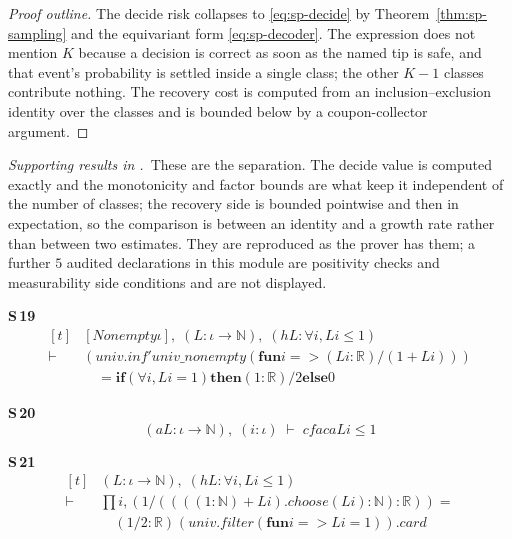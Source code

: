 \begin{proof}[Proof outline]
The decide risk collapses to \eqref{eq:sp-decide} by Theorem~\ref{thm:sp-sampling} and the
equivariant form \eqref{eq:sp-decoder}. The expression does not mention $K$ because a decision is
correct as soon as the named tip is safe, and that event's probability is settled inside a
single class; the other $K-1$ classes contribute nothing. The recovery cost is computed from
an inclusion--exclusion identity over the classes and is bounded below by a coupon-collector
argument.
\end{proof}


\noindent\emph{Supporting results in .}~These are the separation. The decide value is computed exactly and the monotonicity and factor bounds are what keep it independent of the number of classes; the recovery side is bounded pointwise and then in expectation, so the comparison is between an identity and a growth rate rather than between two estimates. They are reproduced as the prover has them; a further $5$ audited declarations in this module are positivity checks and measurability side conditions and are not displayed.

\noindent\textbf{S\,19}\quad{}
{\footnotesize\[ \begin{aligned}[t]
&[\mathit{Nonempty} \iota ],\; (\mathit{L} : \iota \to \mathbb{N} ),\; (\mathit{hL} : \forall \mathit{i}, \mathit{L} \mathit{i} \leq 1)\\
\vdash\;&(\mathit{univ}.\mathit{inf'} \mathit{univ\_nonempty} (\mathbf{fun} \mathit{i} => (\mathit{L} \mathit{i} : \mathbb{R} ) / (1 + \mathit{L} \mathit{i})))\\
&\quad = \mathbf{if} (\forall \mathit{i}, \mathit{L} \mathit{i} = 1) \mathbf{then} (1 : \mathbb{R} ) / 2 \mathbf{else} 0
\end{aligned} \]}

\noindent\textbf{S\,20}\quad{}
{\footnotesize\[ (\mathit{a} \mathit{L} : \iota \to \mathbb{N} ),\; (\mathit{i} : \iota ) \;\vdash\; \mathit{cfac} \mathit{a} \mathit{L} \mathit{i} \leq 1 \]}

\noindent\textbf{S\,21}\quad{}
{\footnotesize\[ \begin{aligned}[t]
&(\mathit{L} : \iota \to \mathbb{N} ),\; (\mathit{hL} : \forall \mathit{i}, \mathit{L} \mathit{i} \leq 1)\\
\vdash\;&\textstyle\prod \mathit{i}, (1 / ((((1:\mathbb{N} ) + \mathit{L} \mathit{i}).\mathit{choose} (\mathit{L} \mathit{i}) : \mathbb{N} ) : \mathbb{R} )) =\\
&\quad (1 / 2 : \mathbb{R} ) ^{} (\mathit{univ}.\mathit{filter} (\mathbf{fun} \mathit{i} => \mathit{L} \mathit{i} = 1)).\mathit{card}
\end{aligned} \]}

